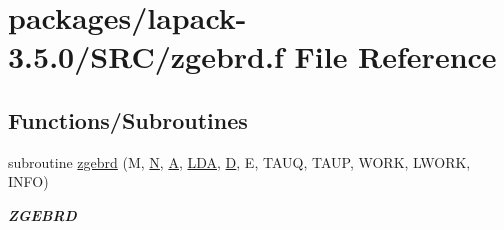 \hypertarget{zgebrd_8f}{}\section{packages/lapack-\/3.5.0/\+S\+R\+C/zgebrd.f File Reference}
\label{zgebrd_8f}
\subsection*{Functions/\+Subroutines}
\begin{DoxyCompactItemize}
\item 
subroutine \hyperlink{group__complex16GEcomputational_gad12a48a5c74ecf1697170d85d71d7e96}{zgebrd} (M, \hyperlink{polmisc_8c_a0240ac851181b84ac374872dc5434ee4}{N}, \hyperlink{classA}{A}, \hyperlink{example__user_8c_ae946da542ce0db94dced19b2ecefd1aa}{L\+D\+A}, \hyperlink{odrpack_8h_a7dae6ea403d00f3687f24a874e67d139}{D}, E, T\+A\+U\+Q, T\+A\+U\+P, W\+O\+R\+K, L\+W\+O\+R\+K, I\+N\+F\+O)
\begin{DoxyCompactList}\small\item\em {\bfseries Z\+G\+E\+B\+R\+D} \end{DoxyCompactList}\end{DoxyCompactItemize}
